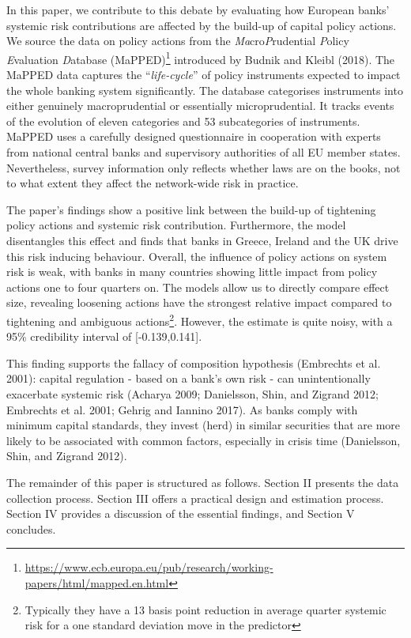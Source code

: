 \documentclass[
  10pt,
]{article}
\begin{document}
In this paper, we contribute to this debate by evaluating how European
banks' systemic risk contributions are affected by the build-up of
capital policy actions. We source the data on policy actions from the
\emph{Ma}cro\emph{P}rudential \emph{P}olicy \emph{E}valuation
\emph{D}atabase (MaPPED)\footnote{\url{https://www.ecb.europa.eu/pub/research/working-papers/html/mapped.en.html}}
introduced by Budnik and Kleibl (2018). The MaPPED data captures the
``\emph{life-cycle}'' of policy instruments expected to impact the whole
banking system significantly. The database categorises instruments into
either genuinely macroprudential or essentially microprudential. It
tracks events of the evolution of eleven categories and 53 subcategories
of instruments. MaPPED uses a carefully designed questionnaire in
cooperation with experts from national central banks and supervisory
authorities of all EU member states. Nevertheless, survey information
only reflects whether laws are on the books, not to what extent they
affect the network-wide risk in practice.

The paper's findings show a positive link between the build-up of
tightening policy actions and systemic risk contribution. Furthermore,
the model disentangles this effect and finds that banks in Greece,
Ireland and the UK drive this risk inducing behaviour. Overall, the
influence of policy actions on system risk is weak, with banks in many
countries showing little impact from policy actions one to four quarters
on. The models allow us to directly compare effect size, revealing
loosening actions have the strongest relative impact compared to
tightening and ambiguous actions\footnote{Typically they have a 13 basis
  point reduction in average quarter systemic risk for a one standard
  deviation move in the predictor}. However, the estimate is quite
noisy, with a 95\% credibility interval of {[}-0.139,0.141{]}.

This finding supports the fallacy of composition hypothesis (Embrechts
et al. 2001): capital regulation - based on a bank's own risk - can
unintentionally exacerbate systemic risk (Acharya 2009; Danielsson,
Shin, and Zigrand 2012; Embrechts et al. 2001; Gehrig and Iannino 2017).
As banks comply with minimum capital standards, they invest (herd) in
similar securities that are more likely to be associated with common
factors, especially in crisis time (Danielsson, Shin, and Zigrand 2012).

The remainder of this paper is structured as follows. Section II
presents the data collection process. Section III offers a practical
design and estimation process. Section IV provides a discussion of the
essential findings, and Section V concludes.
\end{document}
